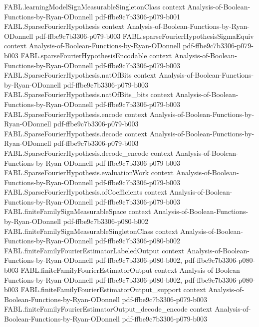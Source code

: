 \begin{theorem}
\proofstep
  {FABL.learningModelSignMeasurableSingletonClass}
  {context}
  {Analysis-of-Boolean-Functions-by-Ryan-ODonnell}
  {pdf-ffbe9c7b3306-p079-b001}
\proofstep
  {FABL.SparseFourierHypothesis}
  {context}
  {Analysis-of-Boolean-Functions-by-Ryan-ODonnell}
  {pdf-ffbe9c7b3306-p079-b003}
\proofstep
  {FABL.sparseFourierHypothesisSigmaEquiv}
  {context}
  {Analysis-of-Boolean-Functions-by-Ryan-ODonnell}
  {pdf-ffbe9c7b3306-p079-b003}
\proofstep
  {FABL.sparseFourierHypothesisEncodable}
  {context}
  {Analysis-of-Boolean-Functions-by-Ryan-ODonnell}
  {pdf-ffbe9c7b3306-p079-b003}
\proofstep
  {FABL.SparseFourierHypothesis.natOfBits}
  {context}
  {Analysis-of-Boolean-Functions-by-Ryan-ODonnell}
  {pdf-ffbe9c7b3306-p079-b003}
\proofstep
  {FABL.SparseFourierHypothesis.natOfBits_bits}
  {context}
  {Analysis-of-Boolean-Functions-by-Ryan-ODonnell}
  {pdf-ffbe9c7b3306-p079-b003}
\proofstep
  {FABL.SparseFourierHypothesis.encode}
  {context}
  {Analysis-of-Boolean-Functions-by-Ryan-ODonnell}
  {pdf-ffbe9c7b3306-p079-b003}
\proofstep
  {FABL.SparseFourierHypothesis.decode}
  {context}
  {Analysis-of-Boolean-Functions-by-Ryan-ODonnell}
  {pdf-ffbe9c7b3306-p079-b003}
\proofstep
  {FABL.SparseFourierHypothesis.decode_encode}
  {context}
  {Analysis-of-Boolean-Functions-by-Ryan-ODonnell}
  {pdf-ffbe9c7b3306-p079-b003}
\proofstep
  {FABL.SparseFourierHypothesis.evaluationWork}
  {context}
  {Analysis-of-Boolean-Functions-by-Ryan-ODonnell}
  {pdf-ffbe9c7b3306-p079-b003}
\proofstep
  {FABL.SparseFourierHypothesis.ofCoefficients}
  {context}
  {Analysis-of-Boolean-Functions-by-Ryan-ODonnell}
  {pdf-ffbe9c7b3306-p079-b003}
\proofstep
  {FABL.finiteFamilySignMeasurableSpace}
  {context}
  {Analysis-of-Boolean-Functions-by-Ryan-ODonnell}
  {pdf-ffbe9c7b3306-p080-b002}
\proofstep
  {FABL.finiteFamilySignMeasurableSingletonClass}
  {context}
  {Analysis-of-Boolean-Functions-by-Ryan-ODonnell}
  {pdf-ffbe9c7b3306-p080-b002}
\proofstep
  {FABL.finiteFamilyFourierEstimatorLabeledOutput}
  {context}
  {Analysis-of-Boolean-Functions-by-Ryan-ODonnell}
  {pdf-ffbe9c7b3306-p080-b002,
    pdf-ffbe9c7b3306-p080-b003}
\proofstep
  {FABL.finiteFamilyFourierEstimatorOutput}
  {context}
  {Analysis-of-Boolean-Functions-by-Ryan-ODonnell}
  {pdf-ffbe9c7b3306-p080-b002,
    pdf-ffbe9c7b3306-p080-b003}
\proofstep
  {FABL.finiteFamilyFourierEstimatorOutput_support}
  {context}
  {Analysis-of-Boolean-Functions-by-Ryan-ODonnell}
  {pdf-ffbe9c7b3306-p079-b003}
\proofstep
  {FABL.finiteFamilyFourierEstimatorOutput_decode_encode}
  {context}
  {Analysis-of-Boolean-Functions-by-Ryan-ODonnell}
  {pdf-ffbe9c7b3306-p079-b003}

\end{theorem}
